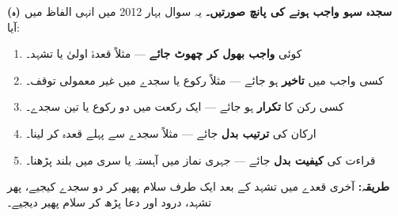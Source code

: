 \begin{hal}
\medskip
\textbf{(ہ) سجدہ سہو واجب ہونے کی پانچ صورتیں۔} یہ سوال بہار \textenglish{2012}
میں انہی الفاظ میں آیا:

\begin{enumerate}\setlength{\itemsep}{1pt}
  \item کوئی \textbf{واجب بھول کر چھوٹ جائے} --- مثلاً قعدۂ اولیٰ یا تشہد۔
  \item کسی واجب میں \textbf{تاخیر} ہو جائے --- مثلاً رکوع یا سجدے میں غیر
        معمولی توقف۔
  \item کسی رکن کا \textbf{تکرار} ہو جائے --- ایک رکعت میں دو رکوع یا تین سجدے۔
  \item ارکان کی \textbf{ترتیب بدل} جائے --- مثلاً سجدے سے پہلے قعدہ کر لینا۔
  \item قراءت کی \textbf{کیفیت بدل} جائے --- جہری نماز میں آہستہ یا سری میں
        بلند پڑھنا۔
\end{enumerate}

\smallskip
\textbf{طریقہ:} آخری قعدے میں تشہد کے بعد ایک طرف سلام پھیر کر دو سجدے کیجیے،
پھر تشہد، درود اور دعا پڑھ کر سلام پھیر دیجیے۔
\end{hal}
